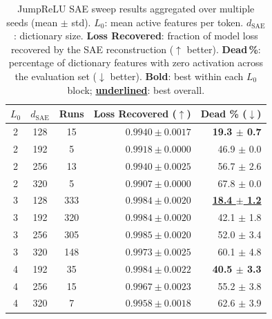 \begin{table}[htbp]
\centering
\caption{JumpReLU SAE sweep results aggregated over multiple seeds (mean $\pm$ std). $L_0$: mean active features per token. $d_\text{SAE}$: dictionary size. \textbf{Loss Recovered}: fraction of model loss recovered by the SAE reconstruction ($\uparrow$ better). \textbf{Dead\,\%}: percentage of dictionary features with zero activation across the evaluation set ($\downarrow$ better).
\textbf{Bold}: best within each $L_0$ block; \underline{\textbf{underlined}}: best overall.}
\label{tab:jrelu_sae_sweep}
\begin{tabular}{cccrr}
\toprule
$L_0$ & $d_\text{SAE}$ & Runs & Loss Recovered ($\uparrow$) & Dead \% ($\downarrow$) \\
\midrule
  2 & 128 & 15 & $\mathbf{0.9940 \pm 0.0017}$ & \textbf{19.3 $\pm$ 0.7} \\
  2 & 192 & 5 & $0.9918 \pm 0.0000$ & 46.9 $\pm$ 0.0 \\
  2 & 256 & 13 & $\mathbf{0.9940 \pm 0.0025}$ & 56.7 $\pm$ 2.6 \\
  2 & 320 & 5 & $0.9907 \pm 0.0000$ & 67.8 $\pm$ 0.0 \\
\midrule
  3 & 128 & 333 & $0.9984 \pm 0.0020$ & \underline{\textbf{18.4 $\pm$ 1.2}} \\
  3 & 192 & 320 & $0.9984 \pm 0.0020$ & 42.1 $\pm$ 1.8 \\
  3 & 256 & 305 & \underline{$\mathbf{0.9985 \pm 0.0020}$} & 52.0 $\pm$ 3.4 \\
  3 & 320 & 148 & $0.9973 \pm 0.0025$ & 60.1 $\pm$ 4.8 \\
\midrule
  4 & 192 & 35 & $\mathbf{0.9984 \pm 0.0022}$ & \textbf{40.5 $\pm$ 3.3} \\
  4 & 256 & 15 & $0.9967 \pm 0.0023$ & 55.2 $\pm$ 3.8 \\
  4 & 320 & 7 & $0.9958 \pm 0.0018$ & 62.6 $\pm$ 3.9 \\
\bottomrule
\end{tabular}
\end{table}

